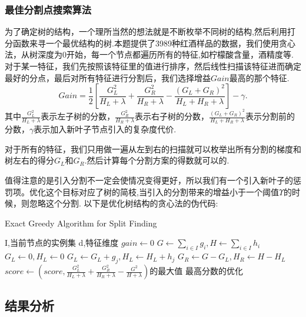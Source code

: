 \documentclass{whutmod}
\begin{document}
\subsubsection{最佳分割点搜索算法}
为了确定树的结构，一个理所当然的想法就是不断枚举不同树的结构,然后利用打分函数来寻一个最优结构的树.本题提供了3989种红酒样品的数据，我们使用贪心法，从树深度为0开始，每一个节点都遍历所有的特征,如柠檬酸含量，酒精度等.对于某一特征，我们先按照该特征里的值进行排序，然后线性扫描该特征进而确定最好的分点，最后对所有特征进行分割后，我们选择增益$Gain$最高的那个特征.
\begin{equation}
Gain=\frac{1}{2}[\frac{G_{L}^{2}}{H_{L}+\lambda}+\frac{G_{R}^{2}}{H_{R}+\lambda}-\frac{(G_{L}+G_{R})^{2}}{H_{L}+H_{R}+\lambda}]-\gamma.
\end{equation}
其中$\frac{G_{L}^{2}}{H_{L}+\lambda}$表示左子树的分数，$\frac{G_{R}^{2}}{H_{R}+\lambda}$表示右子树的分数，$\frac{(G_{L}+G_{R})^{2}}{H_{L}+H_{R}+\lambda}$表示分割前的分数，$\gamma$表示加入新叶子节点引入的复杂度代价.

对于所有的特征，我们只用做一遍从左到右的扫描就可以枚举出所有分割的梯度和树左右的得分$G_{L}$和$G_{R}$.然后计算每个分割方案的得数就可以的.

值得注意的是引入分割不一定会使情况变得更好，所以我们有一个引入新叶子的惩罚项。优化这个目标对应了树的简枝,当引入的分割带来的增益小于一个阈值$\Upsilon$的时候，则忽略这个分割.
以下是优化树结构的贪心法的伪代码:
\begin{algorithm}
	\caption{Exact Greedy Algorithm for Split Finding}
	\begin{algorithmic}
		\Require I,当前节点的实例集
		\Require d,特征维度
		\State $gain \gets 0$  $G \gets \sum_{i\in I}g_{i},H \gets \sum_{i\in I}h_{i}$ 
		\State $G_{L}\gets 0,H_{L} \gets 0$
		\State $G_{L}\gets G_{L}+g_{j},H_{L} \gets H_{L}+h_{j}$ 
		\State $G_{R}\gets G-G_{L},H_{R} \gets H-H_{L}$ 
		\State $score\gets (score,\frac{G_{L}^{2}}{H_{L}+\lambda}+\frac{G_{R}^{2}}{H_{R}+\lambda}-\frac{G^{2}}{H+\lambda})\text{的最大值}$
		\EndFor
		\EndFor
		\Ensure 最高分数的优化
		
	\end{algorithmic} 
\end{algorithm}
\subsection{结果分析}
\end{document}
